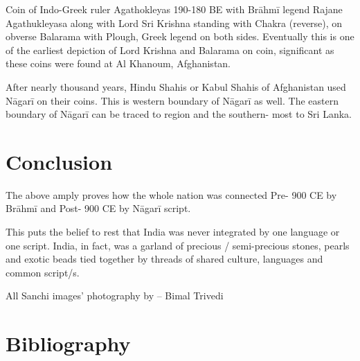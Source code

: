 Coin of Indo-Greek ruler Agathokleyas 190-180 BE with Brāhmī legend Rajane Agathukleyasa along with Lord Sri Krishna standing with Chakra (reverse), on obverse Balarama with Plough, Greek legend on both sides. Eventually this is one of the earliest depiction of Lord Krishna and Balarama on coin, significant as these coins were found at Al Khanoum, Afghanistan.

After nearly thousand years, Hindu Shahis or Kabul Shahis of Afghanistan used Nāgarī on their coins. This is western boundary of Nāgarī as well. The eastern boundary of Nāgarī can be traced to  region and the southern- most to Sri Lanka.


\section*{Conclusion}

The above amply proves how the whole nation was connected Pre- 900 CE by Brāhmī and Post- 900 CE by Nāgarī script.

This puts the belief to rest that India was never integrated by one language or one script. India, in fact, was a garland of precious / semi-precious stones, pearls and exotic beads tied together by threads of shared culture, languages and common script/s.

All Sanchi images’ photography by – Bimal Trivedi

\newpage


\section*{Bibliography}

